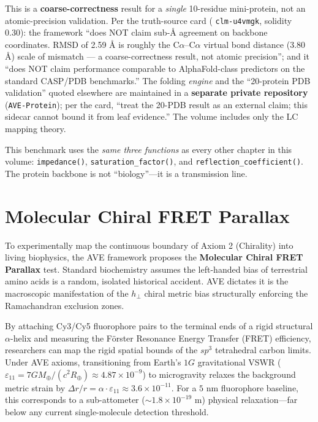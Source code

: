 \begin{tcolorbox}[colback=white, colframe=black, title=\textbf{Scope: coarse-correctness benchmark, not an atomic-precision validation}]
This is a \textbf{coarse-correctness} result for a \emph{single} 10-residue mini-protein, not an atomic-precision validation. Per the truth-source card ( \texttt{clm-u4vmgk}, solidity 0.30): the framework ``does NOT claim sub-\AA{} agreement on backbone coordinates. RMSD of 2.59 \AA{} is roughly the C$\alpha$--C$\alpha$ virtual bond distance (3.80 \AA) scale of mismatch --- a coarse-correctness result, not atomic precision''; and it ``does NOT claim performance comparable to AlphaFold-class predictors on the standard CASP/PDB benchmarks.'' The folding \emph{engine} and the ``20-protein PDB validation'' quoted elsewhere are maintained in a \textbf{separate private repository} (\texttt{AVE-Protein}); per the card, ``treat the 20-PDB result as an external claim; this sidecar cannot bound it from leaf evidence.'' The volume includes only the LC mapping theory.
\end{tcolorbox}

This benchmark uses the \textit{same three functions} as every other chapter in this volume: \texttt{impedance()}, \texttt{saturation\_factor()}, and \texttt{reflection\_coefficient()}. The protein backbone is not ``biology''---it is a transmission line.

\section{Molecular Chiral FRET Parallax}
To experimentally map the continuous boundary of Axiom 2 (Chirality) into living biophysics, the AVE framework proposes the \textbf{Molecular Chiral FRET Parallax} test. Standard biochemistry assumes the left-handed bias of terrestrial amino acids is a random, isolated historical accident. AVE dictates it is the macroscopic manifestation of the $h_{\perp}$ chiral metric bias structurally enforcing the Ramachandran exclusion zones.

By attaching Cy3/Cy5 fluorophore pairs to the terminal ends of a rigid structural $\alpha$-helix and measuring the F\"orster Resonance Energy Transfer (FRET) efficiency, researchers can map the rigid spatial bounds of the $sp^3$ tetrahedral carbon limits. Under AVE axioms, transitioning from Earth's $1G$ gravitational VSWR ($\varepsilon_{11} = 7GM_\oplus/(c^2 R_\oplus) \approx 4.87 \times 10^{-9}$) to microgravity relaxes the background metric strain by $\Delta r / r = \alpha \cdot \varepsilon_{11} \approx 3.6 \times 10^{-11}$. For a $5\text{ nm}$ fluorophore baseline, this corresponds to a sub-attometer ($\sim 1.8 \times 10^{-19}\text{ m}$) physical relaxation---far below any current single-molecule detection threshold.

